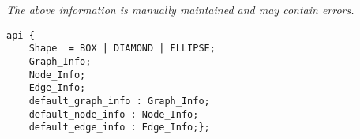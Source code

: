 \label{api:Dot\_Graphtree\_Traits}

{\tiny \it The above information is manually maintained and may contain errors.}
\begin{verbatim}
api {
    Shape  = BOX | DIAMOND | ELLIPSE;
    Graph_Info;
    Node_Info;
    Edge_Info;
    default_graph_info : Graph_Info;
    default_node_info : Node_Info;
    default_edge_info : Edge_Info;};
\end{verbatim}
